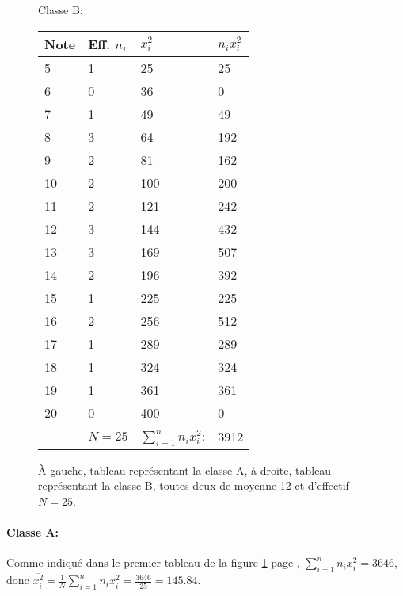 \documentclass[a4paper,12pt]{scrartcl}
\begin{document}
\begin{figure}[h]
\begin{multicols}{2}
\begin{minipage}{0.49\linewidth}
\begin{center}
Classe B:
\end{center}
\begin{tabular}{|l|l|l|l|}
\hline
\textbf{Note} & \textbf{Eff. $n_i$} & \textbf{$x_i^2$} & \textbf{$n_i x_i^2$} \\ \hline
5    & 1              & 25      & 25          \\ \hline
6    & 0              & 36      & 0           \\ \hline
7    & 1              & 49      & 49          \\ \hline
8    & 3              & 64      & 192         \\ \hline
9    & 2              & 81      & 162         \\ \hline
10   & 2              & 100     & 200         \\ \hline
11   & 2              & 121     & 242         \\ \hline
12   & 3              & 144     & 432         \\ \hline
13   & 3              & 169     & 507         \\ \hline
14   & 2              & 196     & 392         \\ \hline
15   & 1              & 225     & 225         \\ \hline
16   & 2              & 256     & 512         \\ \hline
17   & 1              & 289     & 289         \\ \hline
18   & 1              & 324     & 324         \\ \hline
19   & 1              & 361     & 361         \\ \hline
20   & 0              & 400     & 0           \\ \hline
     &$N = 25$        & $\sum_{i=1}^{n}n_i x_i^2$: & 3912        \\ \hline
\end{tabular}
\end{minipage}
\end{multicols}
\caption{À gauche, tableau représentant la classe A, à droite, tableau représentant la classe B, toutes deux de moyenne 12 et d'effectif $N=25$.}
\label{FigTableaux}
\end{figure}

\paragraph{Classe A:}
Comme indiqué dans le premier tableau de la figure \ref{FigTableaux} page \pageref{FigTableaux}, $\sum_{i=1}^{n}n_i x_i^2 = 3646$, donc $\overline{x_i^2} = \frac{1}{N} \sum_{i=1}^{n}n_i x_i^2 = \frac{3646}{25} = 145.84$.
\end{document}
